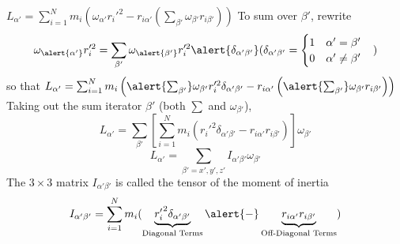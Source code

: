 \begin{frame}
\(L_{\alpha'}=\sum_{i=1}^{N}m_{i}\left(\omega_{\alpha'}r_{i}'^{2}-r_{i\alpha'}\left(\sum_{\beta'}\omega_{\beta'}r_{i\beta'}\right)\right)\)
To sum over $\beta'$, rewrite \[\omega_{\alert{\alpha'}}r_i'^2=\sum_{\beta'}\omega_{\alert{\beta'}}r_{i}'^2\alert{\delta_{\alpha'\beta'}} (\delta_{\alpha'\beta'}=\begin{cases}1\quad\alpha'=\beta'\\0\quad\alpha'\neq\beta'\end{cases})\] so that
\(L_{\alpha'}=\sum_{i=1}^{N}m_{i}\left(\alert{\sum_{\beta'}}\omega_{\beta'}r_{i}'^2\delta_{\alpha'\beta'}-r_{i\alpha'}\left(\alert{\sum_{\beta'}}\omega_{\beta'}r_{i\beta'}\right)\right)\) \pause Taking out the sum iterator \alert{$\beta'$} (both $\sum$ and $\omega_{\beta'}$),
\[L_{\alpha'}=\sum_{\beta'}\left[\sum_{i=1}^{N}m_{i}(r_i'^2\delta_{\alpha'\beta'}-r_{i\alpha'}r_{i\beta'})\right]\omega_{\beta'}\]
\[L_{\alpha'}=\sum_{\beta'=x',y',z'}I_{\alpha'\beta'}\omega_{\beta'}\]
The $3\times 3$ matrix $I_{\alpha'\beta'}$ is called \alert{the tensor of the moment of inertia}\[I_{\alpha'\beta'}=\sum_{i=1}^{N}m_i(\underbrace{{r_{i}'}^{2}\delta_{\alpha'\beta'}}_{\text{Diagonal Terms}}\alert{-}\underbrace{r_{i\alpha'}r_{i\beta'}}_{\text{Off-Diagonal Terms}})\]
\end{frame}
